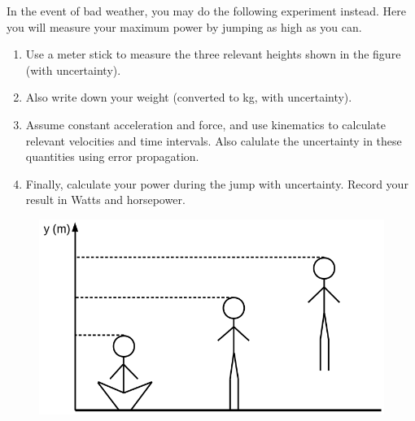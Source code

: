 In the event of bad weather, you may do the following experiment instead.
Here you will measure your maximum power by jumping as high as you can.
\begin{enumerate}
\item Use a meter stick to measure the three relevant heights shown in the figure (with uncertainty).
\item Also write down your weight (converted to kg, with uncertainty).
\item Assume constant acceleration and force, and use kinematics to calculate relevant velocities and time intervals. Also calulate the uncertainty in these quantities using error propagation.
\item Finally, calculate your power during the jump with uncertainty. Record your result in Watts and horsepower.
\end{enumerate}

\begin{figure}[H]
\includegraphics[scale=0.50]{figures/workPower/fig2.png}
\end{figure}

\pagebreak \clearpage
